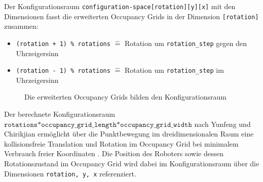 Der Konfigurationsraum \texttt{configuration-space[rotation][y][x]} mit den Dimensionen fasst die erweiterten Occupancy Grids in der Dimension \texttt{[rotation]} zusammen:
\begin{itemize}
\item \texttt{(rotation + 1) \% rotations} $\widehat{=}$ Rotation um \texttt{rotation\_step} gegen den Uhrzeigersinn
\item \texttt{(rotation - 1) \% rotations} $\widehat{=}$ Rotation um \texttt{rotation\_step} im Uhrzeigersinn
\end{itemize}
\vspace*{0.4cm}
\begin{figure}[H]
	\centering
	\footnotesize
	\centerline{}
	\caption{Die erweiterten Occupancy Grids bilden den Konfigurationsraum}
\end{figure}

Der berechnete Konfigurationsraum $\texttt{rotations*occupancy\_grid\_length*occupancy\_grid\_width}$ nach Yunfeng und Chirikjian ermöglicht über die Punktbewegung im dreidimensionalen Raum eine kollisionsfreie Translation und Rotation im Occupancy Grid bei minimalem Verbrauch freier Koordinaten \cite{wang.2000}. 
Die Position des Roboters sowie dessen Rotationszustand im Occupancy Grid wird dabei im Konfigurationsraum über die Dimensionen \texttt{rotation, y, x} referenziert.


